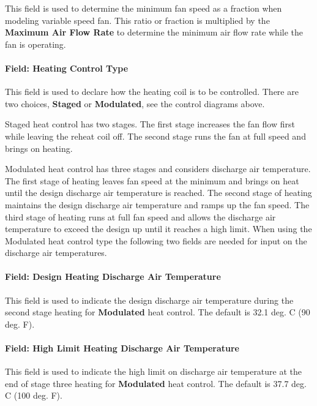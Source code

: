 This field is used to determine the minimum fan speed as a fraction when modeling variable speed fan. This ratio or fraction is multiplied by the \textbf{Maximum Air Flow Rate} to determine the minimum air flow rate while the fan is operating.

\paragraph{Field: Heating Control Type}\label{field-heat-control-type-seriesPIU}

This field is used to declare how the heating coil is to be controlled. There are two choices, \textbf{Staged} or \textbf{Modulated}, see the control diagrams above.

Staged heat control has two stages. The first stage increases the fan flow first while leaving the reheat coil off. The second stage runs the fan at full speed and brings on heating.

Modulated heat control has three stages and considers discharge air temperature. The first stage of heating leaves fan speed at the minimum and brings on heat until the design discharge air temperature is reached. The second stage of heating maintains the design discharge air temperature and ramps up the fan speed. The third stage of heating runs at full fan speed and allows the discharge air temperature to exceed the design up until it reaches a high limit. When using the Modulated heat control type the following two fields are needed for input on the discharge air temperatures.

\paragraph{Field: Design Heating Discharge Air Temperature}\label{field-heat-design-DAT-seriesPIU}

This field is used to indicate the design discharge air temperature during the second stage heating for \textbf{Modulated} heat control. The default is 32.1 deg. C (90 deg. F).

\paragraph{Field: High Limit Heating Discharge Air Temperature}\label{field-heat-limit-DAT-seriesPIU}

This field is used to indicate the high limit on discharge air temperature at the end of stage three heating for \textbf{Modulated} heat control.  The default is 37.7 deg. C (100 deg. F).

